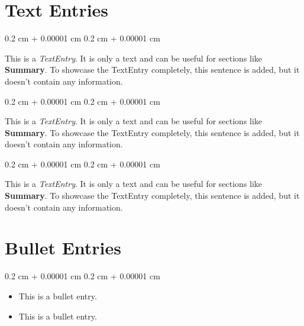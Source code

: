\documentclass[10pt, letterpaper]{article}
\newenvironment{highlightsforbulletentries}{
    \begin{itemize}[
        topsep=0.10 cm,
        parsep=0.10 cm,
        partopsep=0pt,
        itemsep=0pt,
        leftmargin=10pt
    ]
}{
    \end{itemize}
} %
\newenvironment{onecolentry}{
    \begin{adjustwidth}{
        0.2 cm + 0.00001 cm
    }{
        0.2 cm + 0.00001 cm
    }
}{
    \end{adjustwidth}
} %
\begin{document}
    \vspace{0.3 cm - 0.3 cm}


    \section{Text Entries}



        
        \begin{onecolentry}
            This is a \textit{TextEntry}. It is only a text and can be useful for sections like \textbf{Summary}. To showcase the TextEntry completely, this sentence is added, but it doesn't contain any information.
        \end{onecolentry}

        \vspace{0.2 cm}

        \begin{onecolentry}
            This is a \textit{TextEntry}. It is only a text and can be useful for sections like \textbf{Summary}. To showcase the TextEntry completely, this sentence is added, but it doesn't contain any information.
        \end{onecolentry}

        \vspace{0.2 cm}

        \begin{onecolentry}
            This is a \textit{TextEntry}. It is only a text and can be useful for sections like \textbf{Summary}. To showcase the TextEntry completely, this sentence is added, but it doesn't contain any information.
        \end{onecolentry}


    
    \section{Bullet Entries}

    \begin{onecolentry}
        \begin{highlightsforbulletentries}


        \item This is a bullet entry.

        \item This is a bullet entry.


        \end{highlightsforbulletentries}
    \end{onecolentry}
\end{document}
